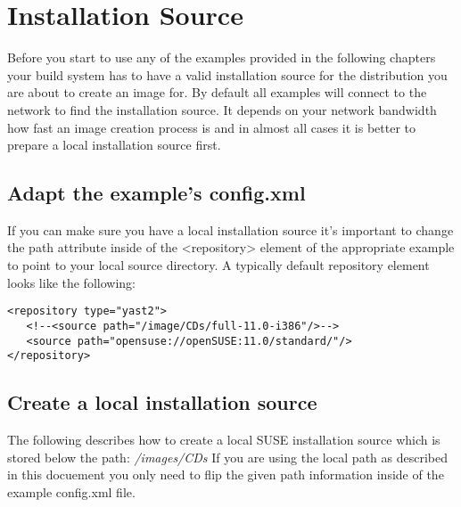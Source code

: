 \chapter{Installation Source}
\label{chapter:instsource}
\minitoc

Before you start to use any of the examples provided in the following
chapters your build system has to have a valid installation source for
the distribution you are about to create an image for.
By default all examples will connect to the network to find the
installation source. It depends on your network bandwidth how fast
an image creation process is and in almost all cases it is better
to prepare a local installation source first.

\section{Adapt the example's config.xml}
If you can make
sure you have a local installation source it's important to change
the path attribute inside of the <repository> element of the
appropriate example to point to your local source directory.
A typically default repository element looks like the following:

\begin{verbatim}
<repository type="yast2">
   <!--<source path="/image/CDs/full-11.0-i386"/>-->
   <source path="opensuse://openSUSE:11.0/standard/"/>
</repository>
\end{verbatim}

\section{Create a local installation source}
The following describes how to create a local SUSE installation
source which is stored below the path: \textit{/images/CDs}
If you are using the local path as described in this docuement
you only need to flip the given path information inside of
the example config.xml file.

